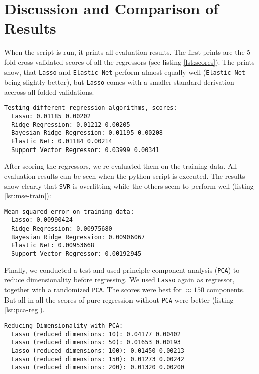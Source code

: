 \section{Discussion and Comparison of Results}

When the script is run, it prints all evaluation results. The first prints are the 5-fold cross validated scores of all the regressors (see listing \ref{lst:scores}). The prints show, that \texttt{Lasso} and \texttt{Elastic Net} perform almost equally well (\texttt{Elastic Net} being slightly better), but \texttt{Lasso} comes with a smaller standard derivation accross all folded validations.

\begin{lstlisting}[caption={Regression Scores},label={lst:scores}]
Testing different regression algorithms, scores:
  Lasso: 0.01185 0.00202
  Ridge Regression: 0.01212 0.00205
  Bayesian Ridge Regression: 0.01195 0.00208
  Elastic Net: 0.01184 0.00214
  Support Vector Regressor: 0.03999 0.00341
\end{lstlisting}

After scoring the regressors, we re-evaluated them on the training data. All evaluation results can be seen when the python script is executed. The results show clearly that \texttt{SVR} is overfitting while the others seem to perform well (listing \ref{lst:mse-train}):

\begin{lstlisting}[caption={Mean squared error on training data},label={lst:mse-train}]
Mean squared error on training data:
  Lasso: 0.00990424
  Ridge Regression: 0.00975680
  Bayesian Ridge Regression: 0.00906067
  Elastic Net: 0.00953668
  Support Vector Regressor: 0.00192945
\end{lstlisting}

Finally, we conducted a test and used principle component analysis (\texttt{PCA}) to reduce dimensionality before regressing. We used \texttt{Lasso} again as regressor, together with a randomized \texttt{PCA}. The scores were best for $\approx 150$ components. But all in all the scores of pure regression without \texttt{PCA} were better (listing \ref{lst:pca-reg}).

\begin{lstlisting}[caption={PCA \& regression},label={lst:pca-reg}]
Reducing Dimensionality with PCA:
  Lasso (reduced dimensions: 10): 0.04177 0.00402
  Lasso (reduced dimensions: 50): 0.01653 0.00193
  Lasso (reduced dimensions: 100): 0.01450 0.00213
  Lasso (reduced dimensions: 150): 0.01273 0.00242
  Lasso (reduced dimensions: 200): 0.01320 0.00200
\end{lstlisting}

